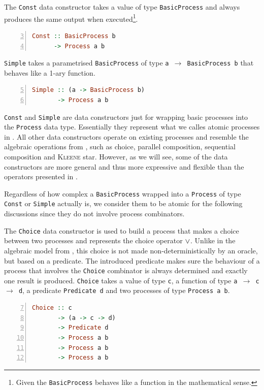 The \texttt{Const} data constructor takes a value of type \texttt{BasicProcess} and always produces the same output when executed\footnote{Given the \texttt{BasicProcess} behaves like a function in the mathematical sense.}.
\begin{lstlisting}[language=Haskell,caption=Signature of the \texttt{Const} data constructor.,numbers=left,frame=bt,firstnumber=3]
Const :: BasicProcess b
      -> Process a b
\end{lstlisting}

\texttt{Simple} takes a parametrised \texttt{BasicProcess} of type \texttt{a $\to$ BasicProcess b} that behaves like a 1-ary function.
\begin{lstlisting}[language=Haskell,caption=Signature of the \texttt{Simple} data constructor.,numbers=left,frame=bt,firstnumber=5]
Simple :: (a -> BasicProcess b)
       -> Process a b
\end{lstlisting}

\texttt{Const} and \texttt{Simple} are data constructors just for wrapping basic processes into the \texttt{Process} data type. Essentially they represent what we calles atomic processes in . All other data constructors operate on existing processes and resemble the algebraic operations from , such as choice, parallel composition, sequential composition and \textsc{Kleene} star. However, as we will see, some of the data constructors are more general and thus more expressive and flexible than the operators presented in .

Regardless of how complex a \texttt{BasicProcess} wrapped into a \texttt{Process} of type \texttt{Const} or \texttt{Simple} actually is, we consider them to be atomic for the following discussions since they do not involve process combinators.

The \texttt{Choice} data constructor is used to build a process that makes a choice between two processes and represents the choice operator $\vee$. Unlike in the algebraic model from , this choice is not made non-deterministically by an oracle, but based on a predicate. The introduced predicate makes sure the behaviour of a process that involves the \texttt{Choice} combinator is always determined and exactly one result is produced. \texttt{Choice} takes a value of type \texttt{c}, a function of type \texttt{a $\to$ c $\to$ d}, a predicate \texttt{Predicate d} and two processes of type \texttt{Process a b}.
\begin{lstlisting}[language=Haskell,caption=Signature of the \texttt{Choice} data constructor.,numbers=left,frame=bt,firstnumber=7]
Choice :: c
       -> (a -> c -> d)
       -> Predicate d
       -> Process a b
       -> Process a b
       -> Process a b
\end{lstlisting}

